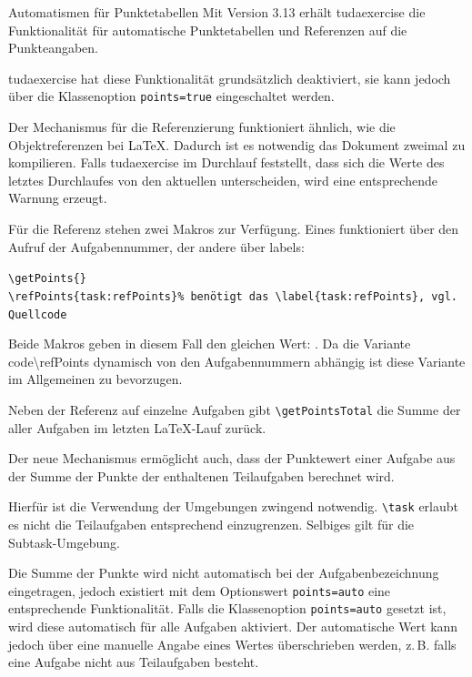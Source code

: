 \documentclass[
	ngerman,
	points=true,%
	]{tudaexercise}
\let\code\texttt
\let\cls\textsf
\let\tbs\textbackslash
\begin{document}
\begin{task}[points=auto]{Automatismen für Punktetabellen}
\label{task:refPoints}
Mit Version 3.13 erhält  \cls{tudaexercise} die Funktionalität für automatische Punktetabellen und Referenzen auf die Punkteangaben.

\begin{subtask}[points=3,title=Referenzen aktivieren]
\cls{tudaexercise} hat diese Funktionalität grundsätzlich deaktiviert, sie kann jedoch über die Klassenoption \code{points=true} eingeschaltet werden. 

Der Mechanismus für die Referenzierung funktioniert ähnlich, wie die Objektreferenzen bei \LaTeX{}. Dadurch ist es notwendig das Dokument zweimal zu kompilieren. Falls \cls{tudaexercise} im Durchlauf feststellt, dass sich die Werte des letztes Durchlaufes von den aktuellen unterscheiden, wird eine entsprechende Warnung erzeugt. 

Für die Referenz stehen zwei Makros zur Verfügung. Eines funktioniert über den Aufruf der Aufgabennummer, der andere über labels:


\verb+\getPoints{+\thetask\verb+}+\\
\verb+\refPoints{task:refPoints}% benötigt das \label{task:refPoints}, vgl. Quellcode+


Beide Makros geben in diesem Fall den gleichen Wert: . Da die Variante code{\tbs{}refPoints} dynamisch von den Aufgabennummern abhängig ist diese Variante im Allgemeinen zu bevorzugen.

Neben der Referenz auf einzelne Aufgaben gibt \code{\tbs{}getPointsTotal} die Summe der aller Aufgaben im letzten \LaTeX-Lauf zurück.

\end{subtask}

\begin{subtask}[points=2,title=Punkte aus Teilaufgaben aufsummieren]
	Der neue Mechanismus ermöglicht auch, dass der Punktewert einer Aufgabe aus der Summe der Punkte der enthaltenen Teilaufgaben berechnet wird.
	
	Hierfür ist die Verwendung der Umgebungen zwingend notwendig. \code{\tbs{}task} erlaubt es nicht die Teilaufgaben entsprechend einzugrenzen. Selbiges gilt für die Subtask-Umgebung. 
	
	Die Summe der Punkte wird nicht automatisch bei der Aufgabenbezeichnung eingetragen, jedoch existiert mit dem Optionswert \code{points=auto} eine entsprechende Funktionalität.
	Falls die Klassenoption \code{points=auto} gesetzt ist, wird diese automatisch für alle Aufgaben aktiviert. Der automatische Wert kann jedoch über eine manuelle Angabe eines Wertes überschrieben werden, z.\,B. falls eine Aufgabe nicht aus Teilaufgaben besteht. 
	

\end{subtask}
\end{task}
\end{document}
